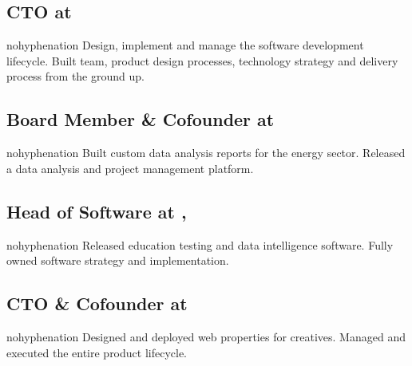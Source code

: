 \fullwidthmode
{
\subsection{\textbf{CTO} at  \shyears{[2015-PRESENT]}}
\begin{sloppypar}\begin{hyphenrules}{nohyphenation}
\small{Design, implement and manage the software development lifecycle.  Built team, product design processes, technology strategy and delivery process from the ground up.}
\end{hyphenrules}\end{sloppypar}
\medskip

\subsection{\textbf{Board Member \& Cofounder} at  \shyears{[2011-PRESENT]}}
\begin{sloppypar}\begin{hyphenrules}{nohyphenation}
\small{Built custom data analysis reports for the energy sector.  Released a data analysis and project management platform.}
\end{hyphenrules}\end{sloppypar}
\medskip

\subsection{\textbf{Head of Software} at ,  \shyears{[2008-2014]}}
\begin{sloppypar}\begin{hyphenrules}{nohyphenation}
\small{Released education testing and data intelligence software.  Fully owned software strategy and implementation.}
\end{hyphenrules}\end{sloppypar}
\medskip

\subsection{\textbf{CTO \& Cofounder} at  \shyears{[2006-2008]}}
\begin{sloppypar}\begin{hyphenrules}{nohyphenation}
\small{Designed and deployed web properties for creatives.  Managed and executed the entire product lifecycle.}
\end{hyphenrules}\end{sloppypar}
\medskip

}
